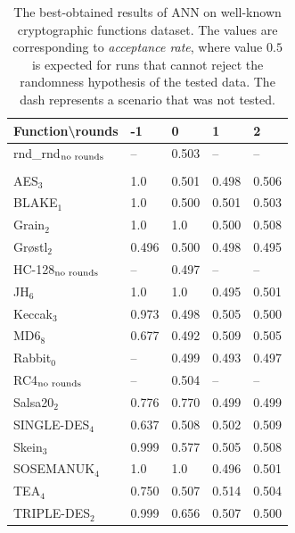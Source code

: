 \documentclass[
  print, %
  Table,   %
  nolof,     %
  nolot,     %
  11pt, %
  oneside  %
]{fithesis3}
\newcommand{\fd}{\cellcolor{myred!15}}
\newcommand{\fn}{\cellcolor{mygreen!20}}
\begin{document}
\begin{table}[t]
\centering
\begin{tabular}{l|l l l l}
Function\textbackslash{}rounds & -1 & 0 & 1 & 2\\ \hline
rnd\_rnd$_{\textnormal{no rounds}}$& -- & \fn{}0.503 & --         & --         \\\\
AES$_{3}$        & \fd{}1.0   & \fn{}0.501 & \fn{}0.498 & \fn{}0.506 \\
BLAKE$_{1}$      & \fd{}1.0   & \fn{}0.500 & \fn{}0.501 & \fn{}0.503 \\
Grain$_{2}$      & \fd{}1.0   & \fd{}1.0   & \fn{}0.500 & \fn{}0.508 \\
Gr\o stl$_{2}$   & \fn{}0.496 & \fn{}0.500 & \fn{}0.498 & \fn{}0.495 \\
HC-128$_{\textnormal{no rounds}}$& --    & \fn{}0.497 & -- & --      \\
JH$_{6}$         & \fd{}1.0   & \fd{}1.0   & \fn{}0.495 & \fn{}0.501 \\
Keccak$_{3}$     & \fd{}0.973 & \fn{}0.498 & \fn{}0.505 & \fn{}0.500 \\
MD6$_{8}$        & \fd{}0.677 & \fn{}0.492 & \fn{}0.509 & \fn{}0.505 \\
Rabbit$_{0}$     &      --    & \fn{}0.499 & \fn{}0.493 & \fn{}0.497 \\
RC4$_{\textnormal{no rounds}}$& --         & \fn{}0.504 & --         & --         \\
Salsa20$_{2}$    & \fd{}0.776 & \fd{}0.770 & \fn{}0.499 & \fn{}0.499 \\
SINGLE-DES$_{4}$ & \fn{}0.637 & \fn{}0.508 & \fn{}0.502 & \fn{}0.509 \\
Skein$_{3}$      & \fd{}0.999 & \fd{}0.577 & \fn{}0.505 & \fn{}0.508 \\
SOSEMANUK$_{4}$  & \fd{}1.0   & \fd{}1.0   & \fn{}0.496 & \fn{}0.501 \\
TEA$_{4}$        & \fd{}0.750 & \fn{}0.507 & \fn{}0.514 & \fn{}0.504 \\
TRIPLE-DES$_{2}$ & \fd{}0.999 & \fd{}0.656 & \fn{}0.507 & \fn{}0.500
\end{tabular}
\caption{The best-obtained results of ANN on well-known cryptographic functions dataset. The values are corresponding to \textit{acceptance rate}, where value $0.5$ is expected for runs that cannot reject the randomness hypothesis of the tested data. The dash represents a scenario that was not tested.}
\label{table:res-usable-ann}
\end{table}
\end{document}

